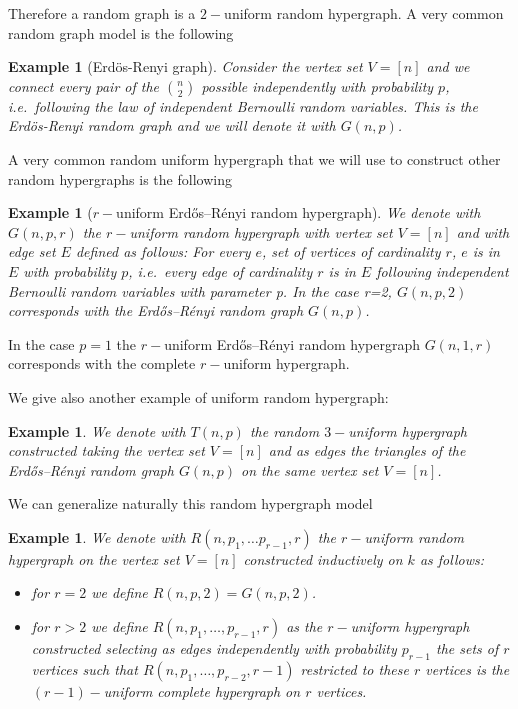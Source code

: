 \documentclass[11pt]{article}
\newtheorem{example}[theorem]{Example}
\begin{document}
Therefore a random graph is a $2-$uniform random hypergraph. A very common random graph model is the following 

\begin{example}[Erd\"os-Renyi graph]
Consider the vertex set $V=[n]$ and we connect every pair of the ${n \choose 2}$ possible independently with probability $p$, i.e.\ following the law of independent Bernoulli random variables. This is the Erd\"os-Renyi random graph and we will denote it with $G(n,p)$.%

\end{example}

A very common random uniform hypergraph that we will use to construct other random hypergraphs is the following

\begin{example}[$r-$uniform Erdős–Rényi random hypergraph] \label{ERRandomHypergraph}We denote with $G(n,p,r)$ the $r-$uniform random hypergraph with vertex set $V=[n]$ and with edge set $E$ defined as follows: For every $e$, set of vertices of cardinality $r$,  $e$ is in $E$ with probability $p$, i.e.\ every edge of cardinality $r$ is in $E$ following independent Bernoulli random variables with parameter p. In the case r=2, $G(n,p,2)$ corresponds with the Erdős–Rényi random graph $G(n,p)$.
\end{example}

In the case $p=1$ the $r-$uniform Erdős–Rényi random hypergraph $G(n,1,r)$ corresponds with the complete $r-$uniform hypergraph.

We give also another example of uniform random hypergraph:
\begin{example}\label{TriangRandHyp}
We denote with $T(n,p)$ the random $3-$uniform hypergraph constructed taking the vertex set $V=[n]$  and as edges the triangles of the  Erdős–Rényi random graph $G(n,p)$ on the same vertex set $V=[n]$.  
\end{example}

We can generalize naturally this random hypergraph model
\begin{example}\label{RandHypergGener}
We denote with $R(n,p_1,\ldots p_{r-1},r)$ the $r-$uniform random hypergraph on the vertex set $V=[n]$ constructed inductively on $k$ as follows:
\begin{itemize}
\item for $r=2$ we define $R(n,p,2)=G(n,p,2)$.  
\item for $r>2$ we define $R(n,p_1,\ldots,p_{r-1},r) $  as the $r-$uniform hypergraph constructed selecting as edges independently with probability $p_{r-1}$ the sets of  $r$ vertices such that $R(n,p_1,\ldots,p_{r-2},r-1) $ restricted to these $r$ vertices is the $(r-1)-$uniform complete hypergraph on $r$ vertices. 
 \end{itemize}
\end{example}
\end{document}
